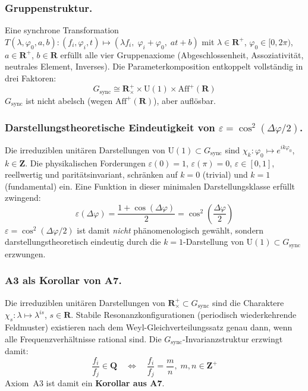 \documentclass[12pt]{iopart}
\providecommand{\mathbb}[1]{\mathbf{#1}}
\begin{document}
	\subsubsection{Gruppenstruktur.}
	
	Eine synchrone Transformation
	$T(\lambda, \varphi_0, a, b):(f_i, \varphi_i, t) \mapsto
	(\lambda f_i,\; \varphi_i + \varphi_0,\; at + b)$
	mit $\lambda \in \mathbb{R}^+$,
	$\varphi_0 \in [0, 2\pi)$,
	$a \in \mathbb{R}^+$, $b \in \mathbb{R}$ erf\"ullt alle
	vier Gruppenaxiome (Abgeschlossenheit, Assoziativit\"at,
	neutrales Element, Inverses). Die Parameterkomposition
	entkoppelt vollst\"andig in drei Faktoren:
	\begin{equation}
		G_{\mathrm{sync}} \cong
		\mathbb{R}^+_\times \times \mathrm{U}(1)
		\times \mathrm{Aff}^+(\mathbb{R})
		\label{eq:gsync_structure}
	\end{equation}
	$G_{\mathrm{sync}}$ ist nicht abelsch (wegen
	$\mathrm{Aff}^+(\mathbb{R})$), aber aufl\"osbar.
	
	\subsubsection{Darstellungstheoretische Eindeutigkeit
		von $\varepsilon = \cos^2(\Delta\varphi/2)$.}
	
	Die irreduziblen unit\"aren Darstellungen von
	$\mathrm{U}(1) \subset G_{\mathrm{sync}}$ sind
	$\chi_k : \varphi_0 \mapsto e^{ik\varphi_0}$,
	$k \in \mathbb{Z}$.
	Die physikalischen Forderungen
	$\varepsilon(0) = 1$, $\varepsilon(\pi) = 0$,
	$\varepsilon \in [0,1]$, reellwertig und parit\"atsinvariant,
	schr\"anken auf $k = 0$ (trivial) und $k = 1$ (fundamental) ein.
	Eine Funktion in dieser minimalen Darstellungsklasse
	erf\"ullt zwingend:
	\begin{equation}
		\varepsilon(\Delta\varphi)
		= \frac{1 + \cos(\Delta\varphi)}{2}
		= \cos^2\!\!\left(\frac{\Delta\varphi}{2}\right)
		\label{eq:eps_unique}
	\end{equation}
	$\varepsilon = \cos^2(\Delta\varphi/2)$ ist damit
	\textit{nicht} ph\"anomenologisch gew\"ahlt, sondern
	darstellungstheoretisch eindeutig durch die
	$k{=}1$-Darstellung von $\mathrm{U}(1) \subset
	G_{\mathrm{sync}}$ erzwungen.
	
	\subsubsection{A3 als Korollar von A7.}
	
	Die irreduziblen unit\"aren Darstellungen von
	$\mathbb{R}^+_\times \subset G_{\mathrm{sync}}$ sind
	die Charaktere $\chi_s : \lambda \mapsto \lambda^{is}$,
	$s \in \mathbb{R}$.
	Stabile Resonanzkonfigurationen (periodisch wiederkehrende
	Feldmuster) existieren nach dem Weyl-Gleichverteilungssatz
	genau dann, wenn alle Frequenzverh\"altnisse rational sind.
	Die $G_{\mathrm{sync}}$-Invarianzstruktur erzwingt damit:
	\begin{equation}
		\frac{f_i}{f_j} \in \mathbb{Q}
		\quad\Leftrightarrow\quad
		\frac{f_i}{f_j} = \frac{m}{n},\;
		m, n \in \mathbb{Z}^+
		\label{eq:a3_corollary}
	\end{equation}
	Axiom~A3 ist damit ein \textbf{Korollar aus A7}.
	
\end{document}
